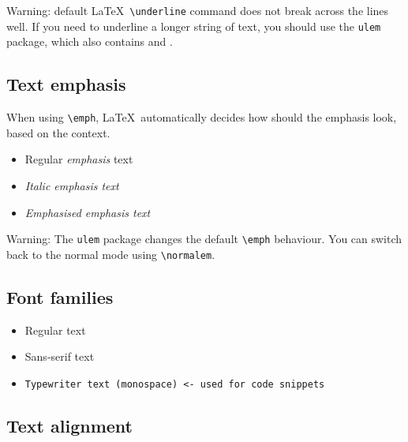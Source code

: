 \documentclass[a4paper]{article}
\newcommand{\sign}[1]{\texttt{\textbackslash{#1}}}
\begin{document}
Warning: default \LaTeX\ \sign{underline\string{\string}} command does not break across the lines well. If you need to underline a longer string of text, you should use the \texttt{ulem} package, which also contains  and . 

\subsection{Text emphasis}

When using \sign{emph\string{\string}}, \LaTeX\ automatically decides how should the emphasis look, based on the context.

\normalem

\begin{itemize}
    \item Regular \emph{emphasis} text
    \item \textit{Italic \emph{emphasis} text }
    \item \emph{Emphasised \emph{emphasis} text }
\end{itemize}


Warning: The \texttt{ulem} package changes the default \sign{emph\string{\string}} behaviour. You can switch back to the normal mode using \sign{normalem}.

\subsection{Font families}

\begin{itemize}
    \item \textrm{Regular text}
    \item \textsf{Sans-serif text}
    \item \texttt{Typewriter text (monospace) <- used for code snippets}
\end{itemize}

\subsection{Text alignment}
\end{document}
